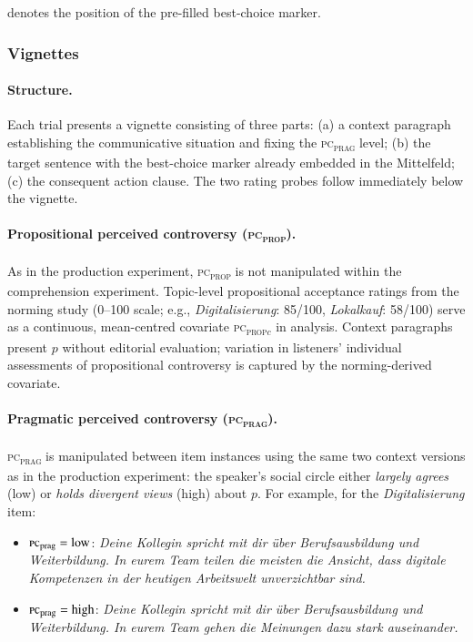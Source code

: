\documentclass[12pt]{article}
\begin{document}
\noindent [M] denotes the position of the pre-filled best-choice marker.

\subsubsection{Vignettes}

\paragraph{Structure.}
Each trial presents a vignette consisting of three parts:
(a) a context paragraph establishing the communicative situation and
fixing the \textsc{pc\textsubscript{prag}} level;
(b) the target sentence with the best-choice marker already embedded
in the Mittelfeld;
(c) the consequent action clause.
The two rating probes follow immediately below the vignette.

\paragraph{Propositional perceived controversy (\textsc{pc\textsubscript{prop}}).}
As in the production experiment, \textsc{pc\textsubscript{prop}} is not
manipulated within the comprehension experiment.
Topic-level propositional acceptance ratings from the norming study
(0--100 scale; e.g., \textit{Digitalisierung}: 85/100,
\textit{Lokalkauf}: 58/100) serve as a continuous, mean-centred
covariate \textsc{pc\textsubscript{prop}}$_c$ in analysis.
Context paragraphs present $p$ without editorial evaluation; variation in
listeners' individual assessments of propositional controversy is
captured by the norming-derived covariate.

\paragraph{Pragmatic perceived controversy (\textsc{pc\textsubscript{prag}}).}
\textsc{pc\textsubscript{prag}} is manipulated between item instances
using the same two context versions as in the production experiment:
the speaker's social circle either \emph{largely agrees} (low) or
\emph{holds divergent views} (high) about $p$.
For example, for the \textit{Digitalisierung} item:

\begin{itemize}
  \item $\textsc{pc}_\text{prag} = \text{low}$: \textit{Deine Kollegin spricht
        mit dir \"uber Berufsausbildung und Weiterbildung.
        In eurem Team teilen die meisten die Ansicht, dass digitale Kompetenzen
        in der heutigen Arbeitswelt unverzichtbar sind.}
  \item $\textsc{pc}_\text{prag} = \text{high}$: \textit{Deine Kollegin spricht
        mit dir \"uber Berufsausbildung und Weiterbildung.
        In eurem Team gehen die Meinungen dazu stark auseinander.}
\end{itemize}
\end{document}
